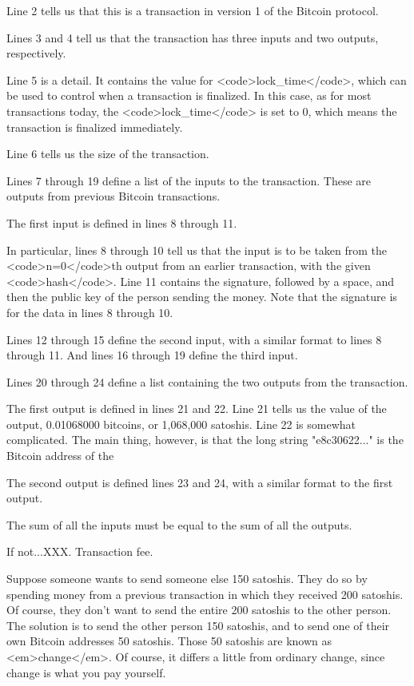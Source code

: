 \documentclass[12pt]{book}
\begin{document}
Line 2 tells us that this is a transaction in version 1 of the Bitcoin
protocol.

Lines 3 and 4 tell us that the transaction has three inputs and two
outputs, respectively.

Line 5 is a detail.  It contains the value for <code>lock_time</code>,
which can be used to control when a transaction is finalized.  In this
case, as for most transactions today, the <code>lock_time</code> is
set to 0, which means the transaction is finalized immediately.

Line 6 tells us the size of the transaction.

Lines 7 through 19 define a list of the inputs to the transaction.
These are outputs from previous Bitcoin transactions.

The first input is defined in lines 8 through 11.  

In particular, lines 8 through 10 tell us that the input is to be
taken from the <code>n=0</code>th output from an earlier transaction,
with the given <code>hash</code>.  Line 11 contains the signature,
followed by a space, and then the public key of the person sending the
money.  Note that the signature is for the data in lines 8 through 10.

Lines 12 through 15 define the second input, with a similar format to
lines 8 through 11.  And lines 16 through 19 define the third input.

Lines 20 through 24 define a list containing the two outputs from the
transaction.

The first output is defined in lines 21 and 22.  Line 21 tells us the
value of the output, 0.01068000 bitcoins, or 1,068,000 satoshis.  Line
22 is somewhat complicated.  The main thing, however, is that the long
string "e8c30622..." is the Bitcoin address of the 

The second output is defined lines 23 and 24, with a similar format to
the first output.

The sum of all the inputs must be equal to the sum of all the outputs.

If not...XXX.  Transaction fee.

Suppose someone wants to send someone else 150 satoshis.  They do so
by spending money from a previous transaction in which they received
200 satoshis.  Of course, they don't want to send the entire 200
satoshis to the other person.  The solution is to send the other
person 150 satoshis, and to send one of their own Bitcoin addresses 50
satoshis.  Those 50 satoshis are known as <em>change</em>.  Of course,
it differs a little from ordinary change, since change is what you pay
yourself.
\end{document}
